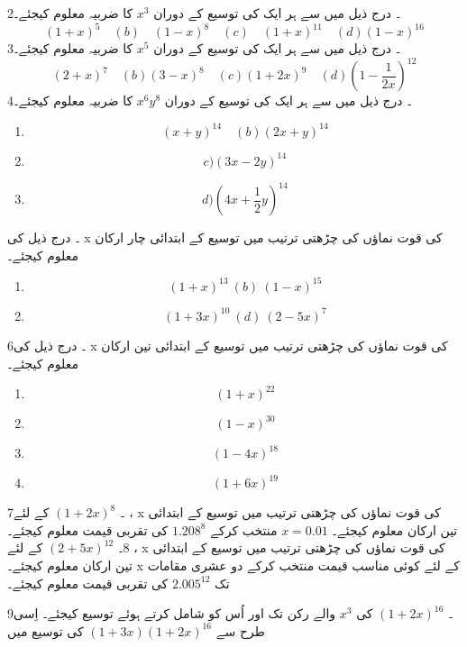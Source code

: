 2۔ درج ذیل میں سے ہر ایک کی توسیع کے دوران 
\(x^{3}\)
کا ضربیہ معلوم کیجئے۔
\[ {(1+x)}^{5}\quad (b)\quad {(1-x)}^{8}\quad (c)\quad {(1+x)}^{11}\quad (d) {(1-x)}^{16}\]
3۔ درج ذیل میں سے ہر ایک کی توسیع کے دوران
\(x^{5}\)
کا ضربیہ معلوم کیجئے۔
\[ {(2+x)}^{7}\quad (b) {(3-x)}^{8}\quad (c) {(1+2x)}^{9}\quad (d) ({1-\frac{1}{2x}})^{12}\]
4۔ درج ذیل میں سے ہر ایک کی توسیع کے دوران
\( {x}^{6}{y}^{8}\)
کا ضربیہ معلوم کیجئے۔
\begin{multicols}{3}
\begin{enumerate}
\item
\[ {(x+y)}^{14}\quad (b) {(2x+y)}^{14}\] 
\item
\[ c){(3x-2y)}^{14}\]
\item
\[ d)(4x+\frac{1}{2}{y})^{14}\]
\end{enumerate}
\end{multicols}

۔  درج ذیل کی x  کی قوت نماؤں کی چڑھتی ترتیب میں توسیع کے ابتدائی چار  ارکان معلوم کیجئے۔ 
\begin{multicols}{2}
\begin{enumerate}
\item
\[ {(1+x)}^{13}\ (b)\ {(1-x)}^{15}\]
\item
\[ {(1+3x)}^{10}\ (d)\ {(2-5x)}^{7}\] 
\end{enumerate}
\end{multicols}
6۔   درج ذیل کی x  کی قوت نماؤں کی چڑھتی ترتیب میں توسیع کے ابتدائی تین  ارکان معلوم کیجئے۔ 
\begin{multicols}{2}
\begin{enumerate}
\item
\[ {(1+x)}^{22}\]
\item
 \[ {(1-x)}^{30}\]
 \item
 \[ {(1-4x)}^{18}\]
 \item
 \[ {(1+6x)}^{19}\]
 \end{enumerate}
\end{multicols}
7۔  
\( {(1+2x)^{8}}\)
کے لئے ،   x  کی قوت نماؤں کی چڑھتی ترتیب میں توسیع کے ابتدائی تین  ارکان معلوم کیجئے۔ 
 \({x}={0.01}\)
منتخب کرکے
 \( {1.208}^{8}\)
کی تقربی  قیمت معلوم کیجئے۔ 
8۔  
\( {(2+5x)^{12}}\)
کے لئے ،   x  کی قوت نماؤں کی چڑھتی ترتیب میں توسیع کے ابتدائی تین  ارکان معلوم کیجئے۔ 
x 
 کے لئے کوئی مناسب قیمت منتخب کرکے دو عشری مقامات تک   
 \( {2.005}^{12}\)
کی تقربی  قیمت معلوم کیجئے۔ 

9۔
 \({(1+2x)^{16}}\)
کی
 \( {x}^{3}\)
والے رکن تک اور اُس کو شامل کرتے ہوئے  توسیع کیجئے۔  اِسی طرح سے 
 \( {(1+3x)}{(1+2x)^{16}}\)
کی توسیع میں  

